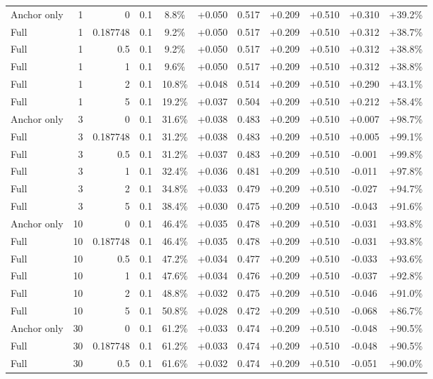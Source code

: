 \begin{table}[htbp]
\begin{tabular}{lrrrccccccc}
Anchor only & 1 & 0 & 0.1 & 8.8\% & +0.050 & 0.517 & +0.209 & +0.510 & +0.310 & +39.2\% \\
Full & 1 & 0.187748 & 0.1 & 9.2\% & +0.050 & 0.517 & +0.209 & +0.510 & +0.312 & +38.7\% \\
Full & 1 & 0.5 & 0.1 & 9.2\% & +0.050 & 0.517 & +0.209 & +0.510 & +0.312 & +38.8\% \\
Full & 1 & 1 & 0.1 & 9.6\% & +0.050 & 0.517 & +0.209 & +0.510 & +0.312 & +38.8\% \\
Full & 1 & 2 & 0.1 & 10.8\% & +0.048 & 0.514 & +0.209 & +0.510 & +0.290 & +43.1\% \\
Full & 1 & 5 & 0.1 & 19.2\% & +0.037 & 0.504 & +0.209 & +0.510 & +0.212 & +58.4\% \\
Anchor only & 3 & 0 & 0.1 & 31.6\% & +0.038 & 0.483 & +0.209 & +0.510 & +0.007 & +98.7\% \\
Full & 3 & 0.187748 & 0.1 & 31.2\% & +0.038 & 0.483 & +0.209 & +0.510 & +0.005 & +99.1\% \\
Full & 3 & 0.5 & 0.1 & 31.2\% & +0.037 & 0.483 & +0.209 & +0.510 & -0.001 & +99.8\% \\
Full & 3 & 1 & 0.1 & 32.4\% & +0.036 & 0.481 & +0.209 & +0.510 & -0.011 & +97.8\% \\
Full & 3 & 2 & 0.1 & 34.8\% & +0.033 & 0.479 & +0.209 & +0.510 & -0.027 & +94.7\% \\
Full & 3 & 5 & 0.1 & 38.4\% & +0.030 & 0.475 & +0.209 & +0.510 & -0.043 & +91.6\% \\
Anchor only & 10 & 0 & 0.1 & 46.4\% & +0.035 & 0.478 & +0.209 & +0.510 & -0.031 & +93.8\% \\
Full & 10 & 0.187748 & 0.1 & 46.4\% & +0.035 & 0.478 & +0.209 & +0.510 & -0.031 & +93.8\% \\
Full & 10 & 0.5 & 0.1 & 47.2\% & +0.034 & 0.477 & +0.209 & +0.510 & -0.033 & +93.6\% \\
Full & 10 & 1 & 0.1 & 47.6\% & +0.034 & 0.476 & +0.209 & +0.510 & -0.037 & +92.8\% \\
Full & 10 & 2 & 0.1 & 48.8\% & +0.032 & 0.475 & +0.209 & +0.510 & -0.046 & +91.0\% \\
Full & 10 & 5 & 0.1 & 50.8\% & +0.028 & 0.472 & +0.209 & +0.510 & -0.068 & +86.7\% \\
Anchor only & 30 & 0 & 0.1 & 61.2\% & +0.033 & 0.474 & +0.209 & +0.510 & -0.048 & +90.5\% \\
Full & 30 & 0.187748 & 0.1 & 61.2\% & +0.033 & 0.474 & +0.209 & +0.510 & -0.048 & +90.5\% \\
Full & 30 & 0.5 & 0.1 & 61.6\% & +0.032 & 0.474 & +0.209 & +0.510 & -0.051 & +90.0\% \\

\end{tabular}
\end{table}

